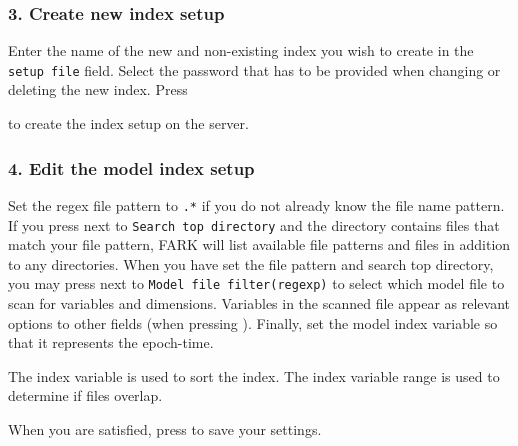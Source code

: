 \documentclass[letterpaper,10pt,twoside,twocolumn,openany]{book}
\begin{document}
\subsubsection{3. Create new index setup}
Enter the name of the new and non-existing index you wish to create in the \lstinline!setup file! field.
Select the password that has to be provided when changing or deleting the new index.
Press { to create the index setup on the server.

\subsubsection{4. Edit the model index setup}
Set the regex file pattern to \lstinline!.*! if you do not already know the file name pattern.
If you press  next to \lstinline!Search top directory! 
and the directory contains files that match your file pattern, 
FARK will list available file patterns and files in addition to any directories.
When you have set the file pattern and search top directory,
you may press  next to
\lstinline!Model file filter(regexp)! to select which model file to scan for variables and dimensions.
Variables in the scanned file appear as relevant options to other fields 
(when pressing ).
Finally, set the model index variable so that it represents the epoch-time.
\begin{quotebox}
The index variable is used to sort the index. 
The index variable range is used to determine if files overlap.
\end{quotebox}
When you are satisfied, press  to save your settings.
}
\end{document}

